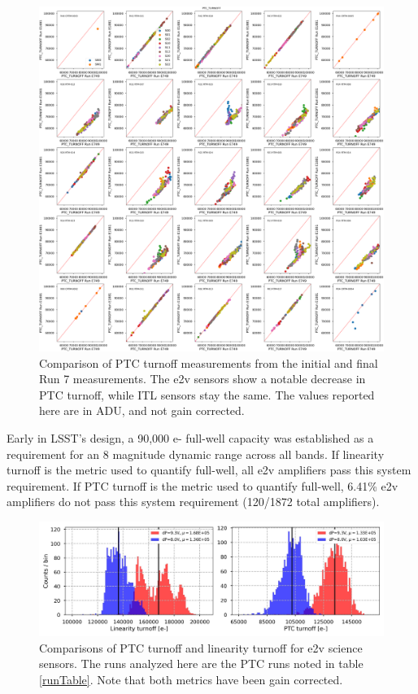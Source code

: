 \begin{figure}[ht]
    \centering
    \includegraphics[width=0.7\linewidth]{figures/finalCharacterization/E749_E1881_PTC_TURNOFF.png}
    \caption{Comparison of PTC turnoff measurements from the initial and final Run 7 measurements. The e2v sensors show a notable decrease in PTC turnoff, while ITL sensors stay the same. The values reported here are in ADU, and not gain corrected.}
    \label{fig:finalChar-PTCTurnoff-5x5}
\end{figure}


Early in LSST's design, a 90,000 e- full-well capacity was established as a requirement for an 8 magnitude dynamic range across all bands. If linearity turnoff is the metric used to quantify full-well, all e2v amplifiers pass this system requirement. If PTC turnoff is the metric used to quantify full-well, 6.41\% e2v amplifiers do not pass this system requirement (120/1872 total amplifiers). 

\begin{figure}[ht]
    \centering
    \includegraphics[width=0.7\linewidth]{figures/finalCharacterization/fullWellComparisons.jpg}
    \caption{Comparisons of PTC turnoff and linearity turnoff for e2v science sensors. The runs analyzed here are the PTC runs noted in table \ref{runTable}. Note that both metrics have been gain corrected.}
    \label{fig:finalChar-fullWell}
\end{figure}


